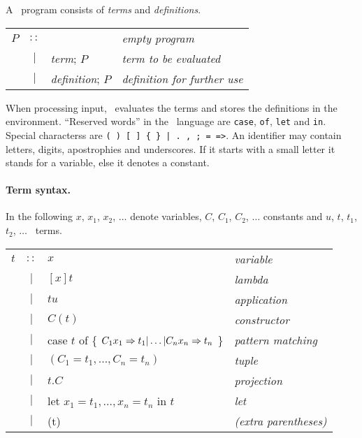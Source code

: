 
A \foetus\ program consists of {\em terms} and {\em definitions}.
\begin{center}
\begin{tabular}{rcll}
$P$ & $::$ &                       & {\it empty program} \\
    & $|$  & {\it term};       $P$ & {\it term to be evaluated} \\
    & $|$  & {\it definition}; $P$ & {\it definition for further use}
\end{tabular}
\end{center}
When processing input, \foetus\ evaluates the terms and stores the
definitions in the environment. ``Reserved words'' in the \foetus\
language are {\tt case}, {\tt of}, {\tt let} and {\tt in}.
Special characterss are {\tt ( ) [ ] \{ \} | .\ , ; = =>}. An identifier may
contain letters, digits, apostrophies and underscores.
If it starts with a small letter it stands for a variable,
else it denotes a constant.
\paragraph*{Term syntax.} In the following
$x$, $x_1$, $x_2$, $\dots$ denote variables,
$C$, $C_1$, $C_2$, $\dots$ constants and
$u$, $t$, $t_1$, $t_2$, $\dots$ \foetus\ terms.
\begin{center}
\begin{tabular}{rcll}
$t$ & $::$ & $x$       & {\it variable} \\
    & $|$  & $[x]t$    & {\it lambda} \\
    & $|$  & $t u$     & {\it application} \\
    & $|$  & $C(t)$    & {\it constructor} \\
    & $|$  & case $t$ of \{ $C_1 x_1 \Rightarrow t_1 | \dots | C_n x_n
      \Rightarrow t_n$ \}    & {\it pattern matching} \\
    & $|$  & $(C_1 = t_1, \dots, C_n = t_n)$
                       & {\it tuple} \\
    & $|$  & $t.C$     & {\it projection} \\
    & $|$  & let $x_1 = t_1, \dots, x_n = t_n$ in $t$
                       & {\it let} \\
    & $|$  & (t)       & {\it (extra parentheses) }
\end{tabular}
\end{center}

